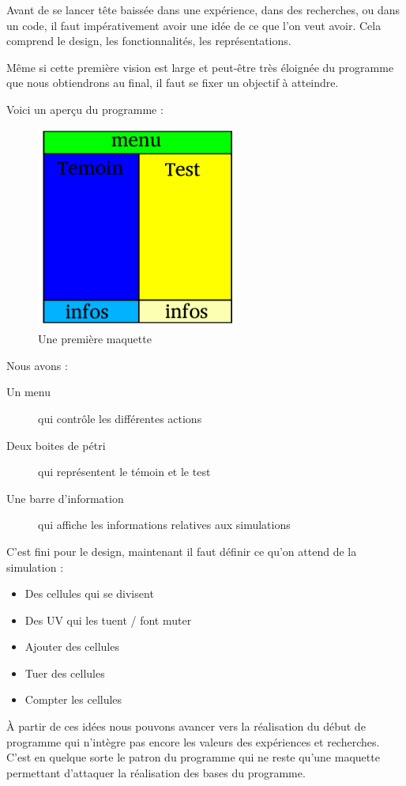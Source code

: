 Avant de se lancer tête baissée dans une expérience, dans des recherches, ou dans un code, il faut impérativement avoir une idée de ce que l'on veut avoir.
Cela comprend le design, les fonctionnalités, les représentations.

Même si cette première vision est large et peut-être très éloignée du programme que nous obtiendrons au final, il faut se fixer un objectif à atteindre.

Voici un aperçu du programme : 
\begin{figure}[H]
	\begin{center}
	  \includegraphics[width=18em]{Images/maquette.pdf}
	\end{center}
	\caption{Une première maquette}
	\label{Maquette}
\end{figure}

Nous avons : 
\begin{description}
	\item[Un menu] qui contrôle les différentes actions
	\item[Deux boites de pétri] qui représentent le témoin et le test
	\item[Une barre d'information] qui affiche les informations relatives aux simulations
\end{description}

C'est fini pour le design, maintenant il faut définir ce qu'on attend de la simulation : 
\begin{itemize}
	\item Des cellules qui se divisent
	\item Des UV qui les tuent / font muter
	\item Ajouter des cellules
	\item Tuer des cellules
	\item Compter les cellules
\end{itemize}

À partir de ces idées nous pouvons avancer vers la réalisation du début de programme qui n'intègre pas encore les valeurs des expériences et recherches. C'est en quelque sorte le patron du programme qui ne reste qu'une maquette permettant d'attaquer la réalisation des bases du programme.


